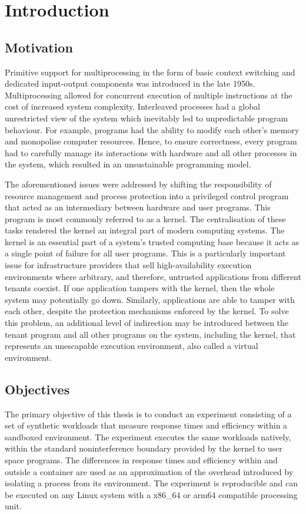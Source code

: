 \chapter{Introduction}
\section{Motivation}
Primitive support for multiprocessing in the form of basic context switching and dedicated input-output 
components was introduced in the late 1950s. Multiprocessing allowed for concurrent execution of 
multiple instructions at the cost of increased system complexity. Interleaved processes had a 
global unrestricted view of the system which inevitably led to unpredictable program behaviour. 
For example, programs had the ability to modify each other's memory and monopolise 
computer resources. Hence, to ensure correctness, every program had to carefully manage its interactions 
with hardware and all other processes in the system, which resulted in an unsustainable 
programming model.

The aforementioned issues were addressed by shifting the responsibility of resource management 
and process protection into a privileged control program that acted as an intermediary between 
hardware and user programs. This program is most commonly referred to as a kernel.
The centralisation of these tasks rendered the kernel an integral part of modern computing systems. 
The kernel is an essential part of a system's trusted computing base because it acts as a 
single point of failure for all user programs. This is a particularly important issue for 
infrastructure providers that sell high-availability execution environments where 
arbitrary, and therefore, untrusted applications from different tenants coexist.
If one application tampers with the kernel, then the whole system may potentially go down. 
Similarly, 
applications are able to tamper with each other, despite the protection mechanisms enforced 
by the kernel. To solve this problem, an additional level of indirection may be introduced between the tenant program
and all other programs on the system, including the kernel, that represents an unescapable 
execution environment, also called a virtual environment.

\section{Objectives}
The primary objective of this thesis is to conduct an experiment consisting of a set of 
synthetic workloads that measure response times and efficiency within a sandboxed environment.
The experiment executes the same workloads natively, within the standard noninterference boundary 
provided by the kernel to user space programs. The differences in response times and efficiency 
within and outside a container are used as an approximation of the overhead introduced 
by isolating a process from its environment. The experiment is reproducible and can be executed 
on any Linux system with a x86\_64 or arm64 compatible processing unit.

